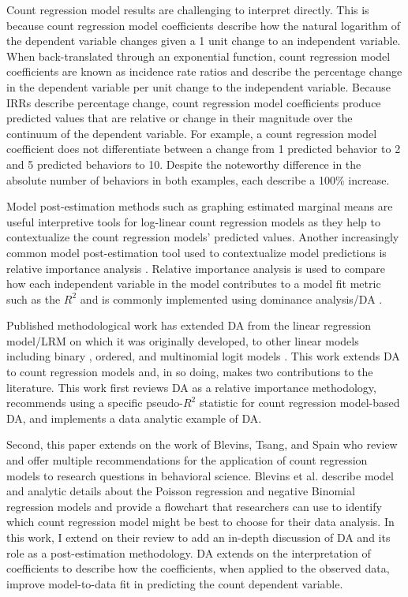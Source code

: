 \documentclass[man]{apa7}
\begin{document}
	Count regression model results are challenging to interpret directly.
	This is because count regression model coefficients describe how the natural logarithm of the dependent variable changes given a 1 unit change to an independent variable. 
	When back-translated through an exponential function, count regression model coefficients are known as incidence rate ratios and describe the percentage change in the dependent variable per unit change to the independent variable.
	Because IRRs describe percentage change, count regression model coefficients produce predicted values that are relative or change in their magnitude over the continuum of the dependent variable.
	For example, a count regression model coefficient does not differentiate between a change from 1 predicted behavior to 2 and 5 predicted behaviors to 10. 
	Despite the noteworthy difference in the absolute number of behaviors in both examples, each describe a 100\% increase.
		
	Model post-estimation methods such as graphing estimated marginal means are useful interpretive tools for log-linear count regression models as they help to contextualize the count regression models' predicted values.
	Another increasingly common model post-estimation tool used to contextualize model predictions is relative importance analysis \parencite{tonidandel2011relative}. 
	Relative importance analysis is used to compare how each independent variable in the model contributes to a model fit metric such as the $R^2$ and is commonly implemented using dominance analysis/DA \parencite{azen2003dominance}.
	
	Published methodological work has extended DA from the linear regression model/LRM on which it was originally developed, to other linear models including binary \parencite{azen2009using}, ordered, and multinomial logit models \parencite{luchman2014relative}.	
	This work extends DA to count regression models and, in so doing, makes two contributions to the literature.
	This work first reviews DA as a relative importance methodology, recommends using a specific pseudo-$R^2$ statistic for count regression model-based DA, and implements a data analytic example of DA.

	Second, this paper extends on the work of Blevins, Tsang, and Spain \parencite*{blevins2015count} who review and offer multiple recommendations for the application of count regression models to research questions in behavioral science. 
	Blevins et al. describe model and analytic details about the Poisson regression and negative Binomial regression models and provide a flowchart that researchers can use to identify which count regression model might be best to choose for their data analysis.
	In this work, I extend on their review to add an in-depth discussion of DA and its role as a post-estimation methodology.
	DA extends on the interpretation of coefficients to describe how the coefficients, when applied to the observed data, improve model-to-data fit in predicting the count dependent variable.
\end{document}
